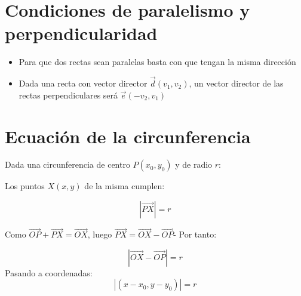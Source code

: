 \documentclass[a4paper,spanish,9pt]{extarticle}
\begin{document}
\begin{multicols*}{2}
\section{Condiciones de paralelismo y perpendicularidad}

\begin{itemize}
\item Para que dos rectas sean paralelas basta con que tengan la misma dirección
\item Dada una recta con vector director $\overrightarrow{d}(v_1,v_2)$, un vector director de las rectas perpendiculares será $\overrightarrow{e}(-v_2,v_1)$ 
\end{itemize}

\section{Ecuación de la circunferencia}

Dada una circunferencia de centro  $P(x_0,y_0)$ y de radio $r$:


Los puntos $X(x,y)$ de la misma  cumplen:

$$\left|\overrightarrow{PX}\right|=r $$


Como $\overrightarrow{OP}+\overrightarrow{PX}=\overrightarrow{OX}$, luego $\overrightarrow{PX}=\overrightarrow{OX}-\overrightarrow{OP}$- Por tanto:

$$\left|\overrightarrow{OX}-\overrightarrow{OP}\right|=r $$
Pasando a coordenadas:
$$ \left|(x-x_0,y-y_0)\right|=r $$


\end{multicols*}
\end{document}
